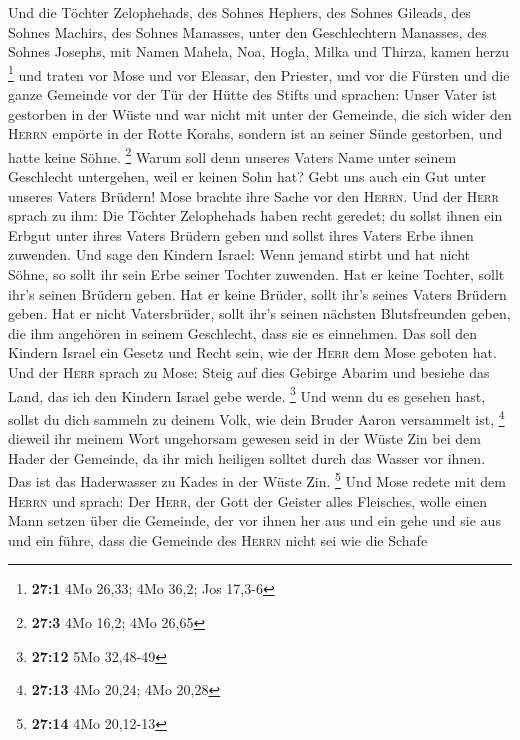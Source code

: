  Und die Töchter Zelophehads, des Sohnes Hephers, des
Sohnes Gileads, des Sohnes Machirs, des Sohnes Manasses, unter den
Geschlechtern Manasses, des Sohnes Josephs, mit Namen Mahela, Noa,
Hogla, Milka und Thirza, kamen herzu \footnote{\textbf{27:1} 4Mo 26,33;
  4Mo 36,2; Jos 17,3-6}  und traten vor Mose und vor
Eleasar, den Priester, und vor die Fürsten und die ganze Gemeinde vor
der Tür der Hütte des Stifts und sprachen:  Unser Vater
ist gestorben in der Wüste und war nicht mit unter der Gemeinde, die
sich wider den \textsc{Herrn} empörte in der Rotte Korahs, sondern ist
an seiner Sünde gestorben, und hatte keine Söhne. \footnote{\textbf{27:3}
  4Mo 16,2; 4Mo 26,65}  Warum soll denn unseres Vaters
Name unter seinem Geschlecht untergehen, weil er keinen Sohn hat? Gebt
uns auch ein Gut unter unseres Vaters Brüdern!  Mose
brachte ihre Sache vor den \textsc{Herrn}.  Und der
\textsc{Herr} sprach zu ihm:  Die Töchter Zelophehads
haben recht geredet; du sollst ihnen ein Erbgut unter ihres Vaters
Brüdern geben und sollst ihres Vaters Erbe ihnen zuwenden.
 Und sage den Kindern Israel: Wenn jemand stirbt und hat
nicht Söhne, so sollt ihr sein Erbe seiner Tochter zuwenden.
 Hat er keine Tochter, sollt ihr's seinen Brüdern geben.
 Hat er keine Brüder, sollt ihr's seines Vaters Brüdern
geben.  Hat er nicht Vatersbrüder, sollt ihr's seinen
nächsten Blutsfreunden geben, die ihm angehören in seinem Geschlecht,
dass sie es einnehmen. Das soll den Kindern Israel ein Gesetz und Recht
sein, wie der \textsc{Herr} dem Mose geboten hat.  Und
der \textsc{Herr} sprach zu Mose: Steig auf dies Gebirge Abarim und
besiehe das Land, das ich den Kindern Israel gebe werde. \footnote{\textbf{27:12}
  5Mo 32,48-49}  Und wenn du es gesehen hast, sollst du
dich sammeln zu deinem Volk, wie dein Bruder Aaron versammelt ist,
\footnote{\textbf{27:13} 4Mo 20,24; 4Mo 20,28}  dieweil
ihr meinem Wort ungehorsam gewesen seid in der Wüste Zin bei dem Hader
der Gemeinde, da ihr mich heiligen solltet durch das Wasser vor ihnen.
Das ist das Haderwasser zu Kades in der Wüste Zin. \footnote{\textbf{27:14}
  4Mo 20,12-13}  Und Mose redete mit dem \textsc{Herrn}
und sprach:  Der \textsc{Herr}, der Gott der Geister
alles Fleisches, wolle einen Mann setzen über die Gemeinde,
 der vor ihnen her aus und ein gehe und sie aus und ein
führe, dass die Gemeinde des \textsc{Herrn} nicht sei wie die Schafe

